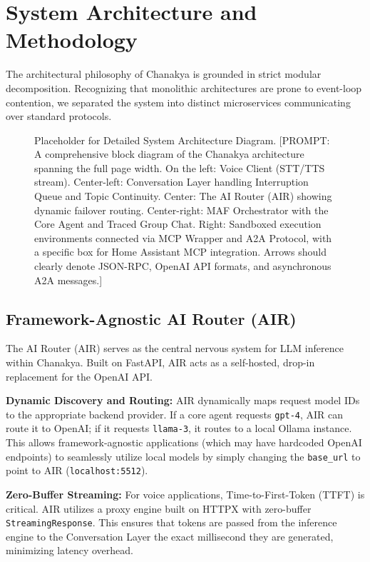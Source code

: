 \documentclass[conference]{IEEEtran}
\begin{document}
\section{System Architecture and Methodology}

The architectural philosophy of Chanakya is grounded in strict modular decomposition. Recognizing that monolithic architectures are prone to event-loop contention, we separated the system into distinct microservices communicating over standard protocols.

\begin{figure}[htbp]
\centerline{
    \fbox{\rule{0pt}{3in} \rule{0.9\linewidth}{0pt}}
}
\caption{Placeholder for Detailed System Architecture Diagram. [PROMPT: A comprehensive block diagram of the Chanakya architecture spanning the full page width. On the left: Voice Client (STT/TTS stream). Center-left: Conversation Layer handling Interruption Queue and Topic Continuity. Center: The AI Router (AIR) showing dynamic failover routing. Center-right: MAF Orchestrator with the Core Agent and Traced Group Chat. Right: Sandboxed execution environments connected via MCP Wrapper and A2A Protocol, with a specific box for Home Assistant MCP integration. Arrows should clearly denote JSON-RPC, OpenAI API formats, and asynchronous A2A messages.]}
\label{fig:full_architecture}
\end{figure}

\subsection{Framework-Agnostic AI Router (AIR)}
The AI Router (AIR) serves as the central nervous system for LLM inference within Chanakya. Built on FastAPI, AIR acts as a self-hosted, drop-in replacement for the OpenAI API.

\textbf{Dynamic Discovery and Routing:} AIR dynamically maps request model IDs to the appropriate backend provider. If a core agent requests \texttt{gpt-4}, AIR can route it to OpenAI; if it requests \texttt{llama-3}, it routes to a local Ollama instance. This allows framework-agnostic applications (which may have hardcoded OpenAI endpoints) to seamlessly utilize local models by simply changing the \texttt{base\_url} to point to AIR (\texttt{localhost:5512}).

\textbf{Zero-Buffer Streaming:} For voice applications, Time-to-First-Token (TTFT) is critical. AIR utilizes a proxy engine built on HTTPX with zero-buffer \texttt{StreamingResponse}. This ensures that tokens are passed from the inference engine to the Conversation Layer the exact millisecond they are generated, minimizing latency overhead.
\end{document}
